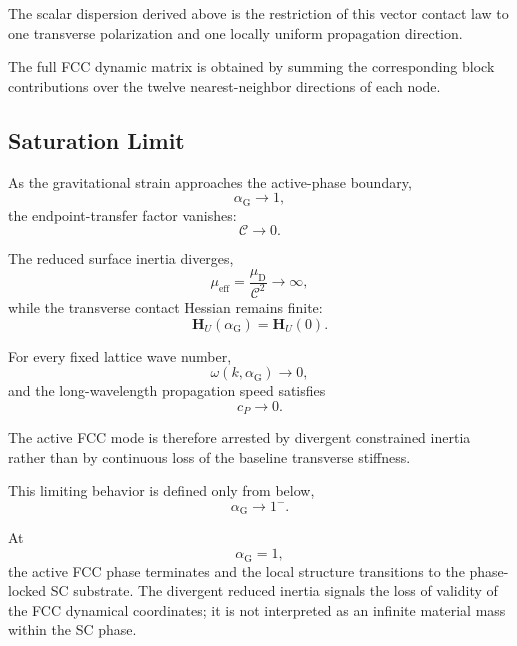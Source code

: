 The scalar dispersion derived above is the restriction of this vector contact law to one transverse polarization and one locally uniform propagation direction.

The full FCC dynamic matrix is obtained by summing the corresponding block contributions over the twelve nearest-neighbor directions of each node.

\subsection{Saturation Limit}

As the gravitational strain approaches the active-phase boundary,
\begin{equation}
    \alpha_{\mathrm{G}} \rightarrow 1,
\end{equation}
the endpoint-transfer factor vanishes:
\begin{equation}
    \mathcal{C} \rightarrow 0.
\end{equation}

The reduced surface inertia diverges,
\begin{equation}
    \mu_{\mathrm{eff}} = \frac{\mu_{\mathrm{D}}}{\mathcal{C}^2} \rightarrow \infty,
\end{equation}
while the transverse contact Hessian remains finite:
\begin{equation}
    \mathbf{H}_U(\alpha_{\mathrm{G}}) = \mathbf{H}_U(0).
\end{equation}

For every fixed lattice wave number,
\begin{equation}
    \omega(k,\alpha_{\mathrm{G}}) \rightarrow 0,
\end{equation}
and the long-wavelength propagation speed satisfies
\begin{equation}
    c_P \rightarrow 0.
\end{equation}

The active FCC mode is therefore arrested by divergent constrained inertia rather than by continuous loss of the baseline transverse stiffness.

This limiting behavior is defined only from below,
\begin{equation}
    \alpha_{\mathrm{G}} \rightarrow 1^{-}.
\end{equation}

At
\begin{equation}
    \alpha_{\mathrm{G}} = 1,
\end{equation}
the active FCC phase terminates and the local structure transitions to the phase-locked SC substrate. The divergent reduced inertia signals the loss of validity of the FCC dynamical coordinates; it is not interpreted as an infinite material mass within the SC phase.

